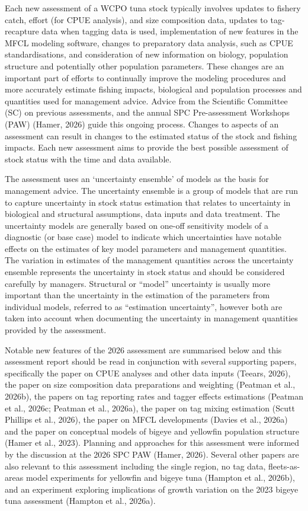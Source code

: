 \documentclass[
  english,
  a4paper,
  a4paper,
  11pt]{SCreport}
\begin{document}
Each new assessment of a WCPO tuna stock typically involves updates to
fishery catch, effort (for CPUE analysis), and size composition data,
updates to tag-recapture data when tagging data is used, implementation
of new features in the MFCL modeling software, changes to preparatory
data analysis, such as CPUE standardisations, and consideration of new
information on biology, population structure and potentially other
population parameters. These changes are an important part of efforts to
continually improve the modeling procedures and more accurately estimate
fishing impacts, biological and population processes and quantities used
for management advice. Advice from the Scientific Committee (SC) on
previous assessments, and the annual SPC Pre-assessment Workshops (PAW)
(Hamer, 2026) guide this ongoing process. Changes to aspects of an
assessment can result in changes to the estimated status of the stock
and fishing impacts. Each new assessment aims to provide the best
possible assessment of stock status with the time and data available.

The assessment uses an `uncertainty ensemble' of models as the basis for
management advice. The uncertainty ensemble is a group of models that
are run to capture uncertainty in stock status estimation that relates
to uncertainty in biological and structural assumptions, data inputs and
data treatment. The uncertainty models are generally based on one-off
sensitivity models of a diagnostic (or base case) model to indicate
which uncertainties have notable effects on the estimates of key model
parameters and management quantities. The variation in estimates of the
management quantities across the uncertainty ensemble represents the
uncertainty in stock status and should be considered carefully by
managers. Structural or ``model'' uncertainty is usually more important
than the uncertainty in the estimation of the parameters from individual
models, referred to as ``estimation uncertainty'', however both are
taken into account when documenting the uncertainty in management
quantities provided by the assessment.

Notable new features of the 2026 assessment are summarised below and
this assessment report should be read in conjunction with several
supporting papers, specifically the paper on CPUE analyses and other
data inputs (Teears, 2026), the paper on size composition data
preparations and weighting (Peatman et al., 2026b), the papers on tag
reporting rates and tagger effects estimations (Peatman et al., 2026c;
Peatman et al., 2026a), the paper on tag mixing estimation (Scutt
Phillips et al., 2026), the paper on MFCL developments (Davies et al.,
2026a) and the paper on conceptual models of bigeye and yellowfin
population structure (Hamer et al., 2023). Planning and approaches for
this assessment were informed by the discussion at the 2026 SPC PAW
(Hamer, 2026). Several other papers are also relevant to this assessment
including the single region, no tag data, fleets-as-areas model
experiments for yellowfin and bigeye tuna (Hampton et al., 2026b), and
an experiment exploring implications of growth variation on the 2023
bigeye tuna assessment (Hampton et al., 2026a).
\end{document}
